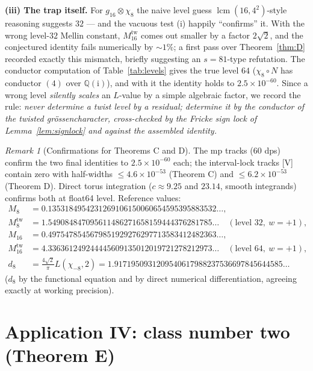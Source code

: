 \documentclass[11pt]{article}
\newcommand{\Qq}{\mathbb{Q}}
\newcommand{\ii}{\mathrm{i}}
\theoremstyle{definition}
\theoremstyle{remark}
\newtheorem{remark}[theorem]{Remark}
\begin{document}
\textbf{(iii) The trap itself.} For $g_{16}\otimes\chi_8$ the naive
level guess $\operatorname{lcm}(16,4^2)$-style reasoning suggests
$32$ --- and the vacuous test (i) happily ``confirms'' it. With the
wrong level-$32$ Mellin constant, $M_{16}^{\mathrm{tw}}$ comes out
smaller by a factor $2\sqrt2$, and the conjectured identity fails
numerically by $\sim1\%$; a first pass over Theorem~\ref{thm:D}
recorded exactly this mismatch, briefly suggesting an $s=81$-type
refutation. The conductor computation of Table~\ref{tab:levels} gives
the true level $64$ ($\chi_8\circ N$ has conductor $(4)$ over
$\Qq(\ii)$), and with it the identity holds to $2.5\times10^{-60}$.
Since a wrong level \emph{silently scales} an $L$-value by a simple
algebraic factor, we record the rule: \emph{never determine a twist
level by a residual; determine it by the conductor of the twisted
grössencharacter, cross-checked by the Fricke sign lock of
Lemma~\ref{lem:signlock} and against the assembled identity.}

\begin{remark}[Confirmations for Theorems C and D]
The mp tracks (60 dps) confirm the two final identities to
$2.5\times10^{-60}$ each; the interval-lock tracks
[V] contain zero with half-widths $\le4.6\times10^{-53}$ (Theorem C)
and $\le6.2\times10^{-53}$ (Theorem D). Direct torus integration
($c\approx9.25$ and $23.14$, smooth integrands) confirms both at
float64 level. Reference values:
\begin{align*}
  M_8&=0.1353184954231269106150060654595395883532\ldots,\\
  M_8^{\mathrm{tw}}&=1.549084847095611486271658159444376281785\ldots
   \quad(\text{level }32,\ w=+1),\\
  M_{16}&=0.4975478545679851929276297713583412482363\ldots,\\
  M_{16}^{\mathrm{tw}}&=4.336361249244445609135012019721278212973\ldots
   \quad(\text{level }64,\ w=+1),\\
  d_8&=\frac{4\sqrt2}{\pi}L(\chi_{-8},2)
   =1.9171950931209540617988237536697845644585\ldots
\end{align*}
($d_8$ by the functional equation and by direct numerical
differentiation, agreeing exactly at working precision).
\end{remark}

\section{Application IV: class number two (Theorem E)}\label{sec:app4}
\end{document}
